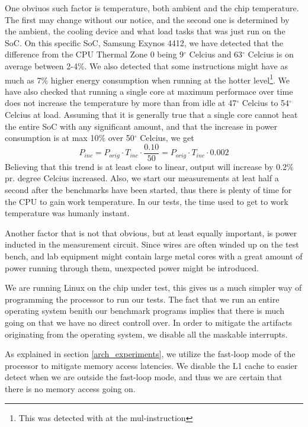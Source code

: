 One obviuos such factor is temperature, both ambient and
the chip temperature. The first may change without our notice, and the second one is
determined by the ambient, the cooling device and what load tasks that was just run on
the SoC. On this specific SoC, Samsung Exynos 4412, we have detected that the difference
from the CPU Thermal Zone 0 being 9$^\circ$ Celcius and 63$^\circ$ Celcius is on average
between 2-4\%. We also detected that some instructions might have as much as 7\% higher
energy consumption when running at the hotter level\footnote{This was detected with at
the {\ttfamily mul}-instruction}. We have also checked that running a single core at
maximum performace over time does not increase the temperature by more than from
idle at 47$^\circ$ Celcius to 54$^\circ$ Celcius at load. Assuming that it is generally
true that a single core cannot heat the entire SoC with any significant amount, and that
the increase in power consumption is at max 10\% over 50$^\circ$ Celcius, we get
\begin{equation}
    P_{inc} = P_{orig} \cdot T_{inc} \cdot \frac{0.10}{50} = P_{orig} \cdot T_{inc} \cdot 0.002
\end{equation}
Believing that this trend is at least close to linear, output will increase by 0.2\% pr.
degree Celcius increased. Also, we start our measurements at leat half a second after the benchmarks
have been started, thus there is plenty of time for the CPU to gain work temperature. In our
tests, the time used to get to work temperature was humanly instant.

Another factor that is not that obvious, but at least equally important, is power inducted
in the measurement circuit. Since wires are often winded up on the test bench, and lab equipment
might contain large metal cores with a great amount of power running through them, unexpected
power might be introduced.

We are running Linux on the chip under test, this gives us a much simpler way of programming
the processor to run our tests. The fact that we run an entire operating system benith our
benchmark programs implies that there is much going on that we have no direct controll over.
In order to mitigate the artifacts originating from the operating system, we
disable all the maskable interrupts.

As explained in section \ref{arch_experiments}, we utilize the fast-loop mode of the processor to mitigate
memory access latencies. We disable the L1 cache to easier detect when we are outside the fast-loop mode,
and thus we are certain that there is no memory access going on.
